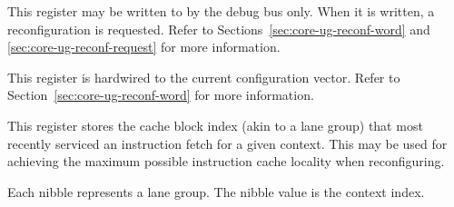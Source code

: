 This register may be written to by the debug bus only. When it is written, a
reconfiguration is requested. Refer to Sections~\ref{sec:core-ug-reconf-word}
and \ref{sec:core-ug-reconf-request} for more information.

\implementation{}


This register is hardwired to the current configuration vector. Refer to
Section~\ref{sec:core-ug-reconf-word} for more information.

\implementation{}


This register stores the cache block index (akin to a lane group) that most
recently serviced an instruction fetch for a given context. This may be used for
achieving the maximum possible instruction cache locality when reconfiguring.

Each nibble represents a lane group. The nibble value is the context index.

\implementation{}
